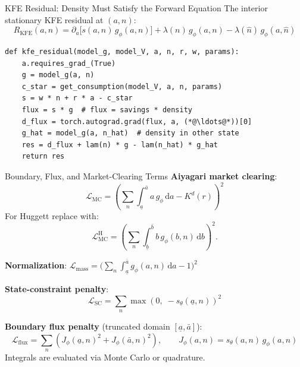 \documentclass[aspectratio=169,11pt]{beamer}
\newcommand{\ud}{\,\mathrm{d}}
\newcommand{\ubar}[1]{\underline{#1}}
\begin{document}
\begin{frame}[fragile]{KFE Residual: Density Must Satisfy the Forward Equation}
\small
The interior stationary KFE residual at $(a, n)$:
\vspace{-0.3em}
\[
R_{\text{KFE}}(a,n) = \partial_a\!\big[s(a,n)\,g_\phi(a,n)\big] + \lambda(n)\,g_\phi(a,n) - \lambda(\hat{n})\,g_\phi(a,\hat{n})
\]
\vspace{-0.5em}
\begin{lstlisting}
def kfe_residual(model_g, model_V, a, n, r, w, params):
    a.requires_grad_(True)
    g = model_g(a, n)
    c_star = get_consumption(model_V, a, n, params)
    s = w * n + r * a - c_star
    flux = s * g  # flux = savings * density
    d_flux = torch.autograd.grad(flux, a, (*@\ldots@*))[0]
    g_hat = model_g(a, n_hat)  # density in other state
    res = d_flux + lam(n) * g - lam(n_hat) * g_hat
    return res
\end{lstlisting}
\end{frame}

\begin{frame}{Boundary, Flux, and Market-Clearing Terms}
\footnotesize
\textbf{Aiyagari market clearing}:
\vspace{-0.3em}
\[
\mathcal{L}_{\text{MC}} =
\left(\textstyle\sum_{n}\int_{\ubar a}^{\bar a}a\,g_\phi\ud a-K^{d}(r)\right)^2
\]
\vspace{-0.6em}
For Huggett replace with:
\[
\mathcal{L}_{\text{MC}}^{\text{H}}=\left(\textstyle\sum_n\int_{\ubar b}^{\bar b} b\,g_\phi(b,n)\ud b\right)^2.
\]

\vspace{-0.1em}
\textbf{Normalization}: \;
$\mathcal{L}_{\text{mass}} = \bigl(\sum_{n} \int_{\ubar{a}}^{\bar{a}} g_\phi(a,n)\ud a - 1\bigr)^2$

\vspace{0.05em}
\textbf{State-constraint penalty}:
\[
\mathcal{L}_{\text{SC}} = \sum_{n} \max\!\left(0,\; -s_\theta(\ubar{a}, n)\right)^2
\]

\vspace{-0.1em}
\textbf{Boundary flux penalty} (truncated domain $[\ubar a,\bar a]$):
\[
\mathcal{L}_{\text{flux}} = \sum_n\left(J_\phi(\ubar a,n)^2 + J_\phi(\bar a,n)^2\right),\qquad
J_\phi(a,n)=s_\theta(a,n)\,g_\phi(a,n)
\]
Integrals are evaluated via Monte Carlo or quadrature.
\end{frame}
\end{document}
